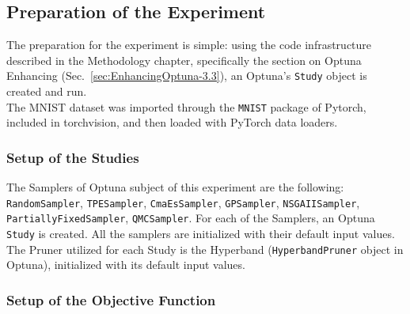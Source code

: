 % 
% 
% 

\subsection{Preparation of the Experiment}

The preparation for the experiment is simple: using the code infrastructure described in the Methodology chapter, specifically the section on Optuna Enhancing (Sec.~\ref{sec:EnhancingOptuna-3.3}), an Optuna's \texttt{Study} object is created and run.
\\[0.3cm]The MNIST dataset was imported through the \texttt{MNIST} package of Pytorch, included in torchvision, and then loaded with PyTorch data loaders.

\subsubsection{Setup of the Studies}

The Samplers of Optuna subject of this experiment are the following: \texttt{RandomSampler}, \texttt{TPESampler}, \texttt{CmaEsSampler}, \texttt{GPSampler}, \texttt{NSGAIISampler}, \texttt{PartiallyFixedSampler}, \texttt{QMCSampler}.
For each of the Samplers, an Optuna \texttt{Study} is created. All the samplers are initialized with their default input values.
\\[0.3cm]The Pruner utilized for each Study is the Hyperband (\texttt{HyperbandPruner} object in Optuna), initialized with its default input values.

\subsubsection{Setup of the Objective Function}

